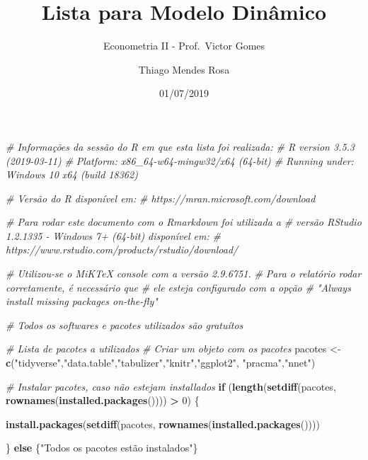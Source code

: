 \documentclass[12pt,a4paper]{article}
\title{Lista para Modelo Dinâmico}
\subtitle{Econometria II - Prof.~Victor Gomes}
\author{Thiago Mendes Rosa}
\date{01/07/2019}
\newenvironment{Shaded}{\begin{snugshade}}{\end{snugshade}}
\newcommand{\CommentTok}[1]{\textcolor[rgb]{0.56,0.35,0.01}{\textit{#1}}}
\newcommand{\ControlFlowTok}[1]{\textcolor[rgb]{0.13,0.29,0.53}{\textbf{#1}}}
\newcommand{\DecValTok}[1]{\textcolor[rgb]{0.00,0.00,0.81}{#1}}
\newcommand{\KeywordTok}[1]{\textcolor[rgb]{0.13,0.29,0.53}{\textbf{#1}}}
\newcommand{\NormalTok}[1]{#1}
\newcommand{\OperatorTok}[1]{\textcolor[rgb]{0.81,0.36,0.00}{\textbf{#1}}}
\newcommand{\StringTok}[1]{\textcolor[rgb]{0.31,0.60,0.02}{#1}}
\begin{document}
\maketitle

\begin{Shaded}
\begin{Highlighting}[]
\CommentTok{# Informações da sessão do R em que esta lista foi realizada:}
\CommentTok{# R version 3.5.3 (2019-03-11)}
\CommentTok{# Platform: x86_64-w64-mingw32/x64 (64-bit)}
\CommentTok{# Running under: Windows 10 x64 (build 18362)}

\CommentTok{# Versão do R disponível em:}
\CommentTok{# https://mran.microsoft.com/download}

\CommentTok{# Para rodar este documento com o Rmarkdown foi utilizada a}
\CommentTok{# versão RStudio 1.2.1335 - Windows 7+ (64-bit) disponível em:}
\CommentTok{# https://www.rstudio.com/products/rstudio/download/}

\CommentTok{# Utilizou-se o MiKTeX console com a versão 2.9.6751.}
\CommentTok{# Para o relatório rodar corretamente, é necessário que}
\CommentTok{# ele esteja configurado com a opção}
\CommentTok{# "Always install missing packages on-the-fly"}

\CommentTok{# Todos os softwares e pacotes utilizados são gratuítos}

\CommentTok{# Lista de pacotes a utilizados}
\CommentTok{# Criar um objeto com os pacotes}
\NormalTok{pacotes <-}\StringTok{ }\KeywordTok{c}\NormalTok{(}\StringTok{"tidyverse"}\NormalTok{,}\StringTok{"data.table"}\NormalTok{,}\StringTok{"tabulizer"}\NormalTok{,}\StringTok{"knitr"}\NormalTok{,}\StringTok{"ggplot2"}\NormalTok{,}
             \StringTok{"pracma"}\NormalTok{,}\StringTok{"nnet"}\NormalTok{)}

\CommentTok{# Instalar pacotes, caso não estejam installados}
\ControlFlowTok{if}\NormalTok{ (}\KeywordTok{length}\NormalTok{(}\KeywordTok{setdiff}\NormalTok{(pacotes, }\KeywordTok{rownames}\NormalTok{(}\KeywordTok{installed.packages}\NormalTok{()))) }\OperatorTok{>}\StringTok{ }\DecValTok{0}\NormalTok{) \{}
  
  \KeywordTok{install.packages}\NormalTok{(}\KeywordTok{setdiff}\NormalTok{(pacotes, }\KeywordTok{rownames}\NormalTok{(}\KeywordTok{installed.packages}\NormalTok{())))}

\NormalTok{\} }\ControlFlowTok{else}\NormalTok{ \{}\StringTok{"Todos os pacotes estão instalados"}\NormalTok{\}}
\end{Highlighting}
\end{Shaded}
\end{document}
